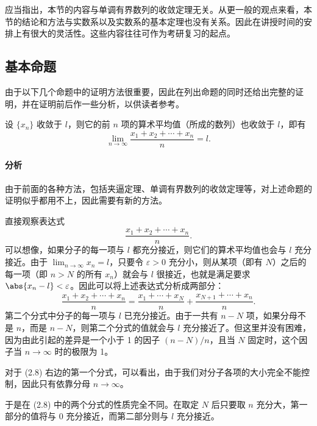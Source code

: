 应当指出，本节的内容与单调有界数列的收敛定理无关。从更一般的观点来看，本节的结论和方法与实数系以及实数系的基本定理也没有关系。因此在讲授时间的安排上有很大的灵活性。这些内容往往可作为考研复习的起点。

\subsection{基本命题}

由于以下几个命题中的证明方法很重要，因此在列出命题的同时还给出完整的证明，并在证明前后作一些分析，以供读者参考。

\begin{xproposition}[2.4.1（Cauchy 命题）]
设 $\{x_n\}$ 收敛于 $l$，则它的前 $n$ 项的算术平均值（所成的数列）也收敛于 $l$，即有
\[
  \lim_{n\to\infty}\frac{x_1+x_2+\cdots+x_n}{n}=l.
\]
\end{xproposition}

\paragraph{分析}
由于前面的各种方法，包括夹逼定理、单调有界数列的收敛定理等，对上述命题的证明似乎都用不上，因此需要有新的方法。

直接观察表达式
\begin{equation}
  \frac{x_1+x_2+\cdots+x_n}{n}.
  \tag{2.7}
  \label{eq:2.7}
\end{equation}
可以想像，如果分子的每一项与 $l$ 都充分接近，则它们的算术平均值也会与 $l$ 充分接近。由于 $\displaystyle\lim_{n\to\infty}x_n=l$，只要令 $\varepsilon>0$ 充分小，则从某项（即有 $N$）之后的每一项（即 $n>N$ 的所有 $x_n$）就会与 $l$ 很接近，也就是满足要求 $\abs{x_n-l}<\varepsilon$。因此可以将上述表达式分析成两部分：
\begin{equation}
  \frac{x_1+x_2+\cdots+x_n}{n}
  =\frac{x_1+\cdots+x_N}{n}+\frac{x_{N+1}+\cdots+x_n}{n}.
  \tag{2.8}
  \label{eq:2.8}
\end{equation}
第二个分式中分子的每一项与 $l$ 已充分接近。由于一共有 $n-N$ 项，如果分母不是 $n$，而是 $n-N$，则第二个分式的值就会与 $l$ 充分接近了。但这里并没有困难，因为由此引起的差异是一个小于 1 的因子 $(n-N)/n$，且当 $N$ 固定时，这个因子当 $n\to\infty$ 时的极限为 1。

对于 (2.8) 右边的第一个分式，可以看出，由于我们对分子各项的大小完全不能控制，因此只有依靠分母 $n\to\infty$。

于是在 (2.8) 中的两个分式的性质完全不同。在取定 $N$ 后只要取 $n$ 充分大，第一部分的值将与 0 充分接近，而第二部分则与 $l$ 充分接近。

